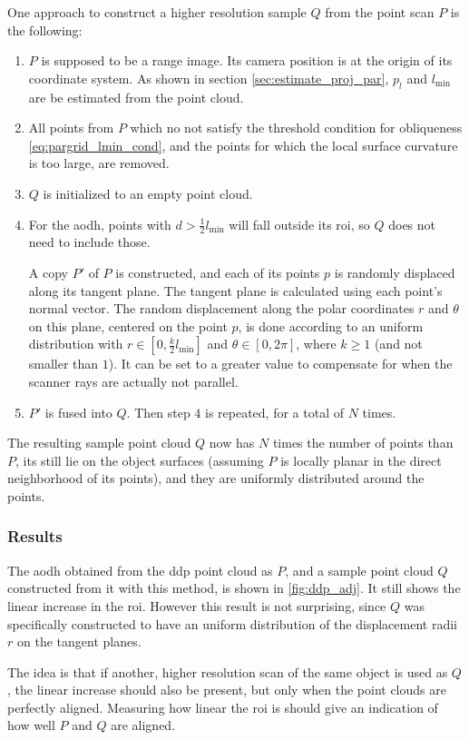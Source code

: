 One approach to construct a higher resolution sample $Q$ from the point scan $P$ is the following:
\begin{enumerate}
\item $P$ is supposed to be a range image. Its camera position is at the origin of its coordinate system. As shown in section \ref{sec:estimate_proj_par}, $p_l$ and $l_{\text{min}}$ are be estimated from the point cloud.
\item All points from $P$ which no not satisfy the threshold condition for obliqueness \ref{eq:pargrid_lmin_cond}, and the points for which the local surface curvature is too large, are removed.
\item $Q$ is initialized to an empty point cloud.
\item For the \gls{aodh}, points with $d > \frac{1}{2} l_{\text{min}}$ will fall outside its \gls{roi}, so $Q$ does not need to include those.

A copy $P'$ of $P$ is constructed, and each of its points $p$ is randomly displaced along its tangent plane. The tangent plane is calculated using each point's normal vector. The random displacement along the polar coordinates $r$ and $\theta$ on this plane, centered on the point $p$, is done according to an uniform distribution with  $r \in [0, \frac{k}{2} l_{\text{min}} ]$ and $\theta \in [0, 2 \pi]$, where $k \geq 1$ (and not smaller than $1$). It can be set to a greater value to compensate for when the scanner rays are actually not parallel.
\item $P'$ is fused into $Q$. Then step $4$ is repeated, for a total of $N$ times.
\end{enumerate}
The resulting sample point cloud $Q$ now has $N$ times the number of points than $P$, its still lie on the object surfaces (assuming $P$ is locally planar in the direct neighborhood of its points), and they are uniformly distributed around the points.

\subsubsection{Results}
The \gls{aodh} obtained from the \gls{ddp} point cloud as $P$, and a sample point cloud $Q$ constructed from it with this method, is shown in \ref{fig:ddp_adj}. It still shows the linear increase in the \gls{roi}. However this result is not surprising, since $Q$ was specifically constructed to have an uniform distribution of the displacement radii $r$ on the tangent planes.

The idea is that if another, higher resolution scan of the same object is used as $Q$, the linear increase should also be present, but only when the point clouds are perfectly aligned. Measuring how linear the \gls{roi} is should give an indication of how well $P$ and $Q$ are aligned.

